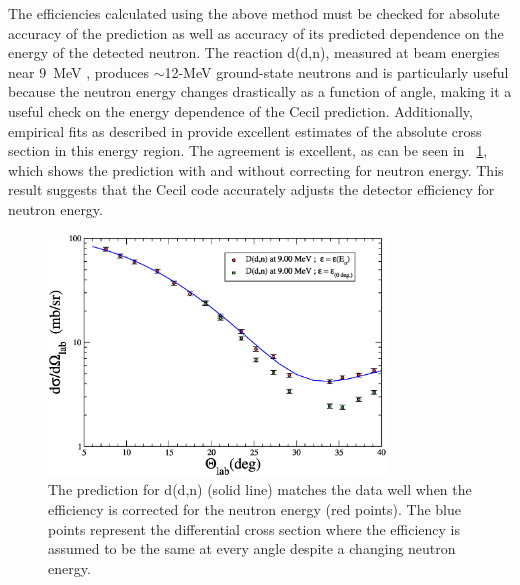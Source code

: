 The efficiencies calculated using the above method must be checked for absolute accuracy of the prediction as well as accuracy of its predicted dependence on the energy of the detected neutron.  The reaction d(d,n), measured at beam energies near 9~MeV \cite{deuteronCrossSections}, produces $\sim$12-MeV ground-state neutrons and is particularly useful because the neutron energy changes drastically as a function of angle, making it a useful check on the energy dependence of the Cecil prediction.  Additionally, empirical fits as described in \cite{deuteronCrossSections} provide excellent estimates of the absolute cross section in this energy region.  The agreement is excellent, as can be seen in {\fig}~\ref{fig:DeuteriumMatch}, which shows the prediction with and without correcting for neutron energy.  This result suggests that the Cecil code accurately adjusts the detector efficiency for neutron energy.  
\begin{figure}[!htbp]
\centering
\includegraphics[width=0.8\textwidth]{figures/deuteriumMatch.eps}
\caption{The prediction for d(d,n) (solid line) matches the data well when the efficiency is corrected for the neutron energy (red points).  The blue points represent the differential cross section where the efficiency is assumed to be the same at every angle despite a changing neutron energy.}
\label{fig:DeuteriumMatch}
\end{figure}

